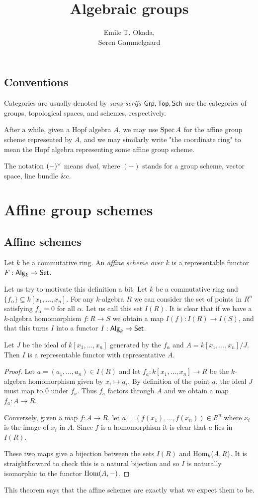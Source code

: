 \documentclass{memoir}
\title{Algebraic groups}
\author{Emile T. Okada,\\ S\o ren Gammelgaard}
\begin{document}
\maketitle
\tableofcontents
\section{Conventions}
Categories are usually denoted by \emph{sans-serifs} \ie $ {\normalfont\mathsf{Grp}}, {\normalfont\mathsf{Top}}, {\normalfont\mathsf{Sch}} $ are the categories of groups, topological spaces, and schemes, respectively. 

After a while, given a Hopf algebra $ A $, we may use $ \operatorname{Spec} A $ for the affine group scheme represented by $ A $, and we may similarly write "the coordinate ring" to mean the Hopf algebra representing some affine group scheme. 

The notation $ (-){}^\vee $ means \emph{dual}, where $ (-) $ stands for a group scheme, vector space, line bundle \&c.
\chapter{Affine group schemes}
\section{Affine schemes}
\begin{definition}
    Let $k$ be a commutative ring. An \textit{affine scheme over $k$} is a representable functor $F:{\normalfont\mathsf{Alg}}_k\to {\normalfont\mathsf{Set}}$.
\end{definition}
Let us try to motivate this definition a bit. 
Let $k$ be a commutative ring and $\{f_\alpha\}\subseteq k[x_1,\dots,x_n]$.
For any $k$-algebra $R$ we can consider the set of points in $R^n$ satisfying $f_\alpha = 0$ for all $\alpha$.
Let us call this set $I(R)$.
It is clear that if we have a $k$-algebra homomorphism $f:R\to S$ we obtain a map $I(f):I(R) \to I(S)$, and that this turns $I$ into a functor $I:{\normalfont\mathsf{Alg}}_k\to {\normalfont\mathsf{Set}}$.
\begin{theorem}
    Let $J$ be the ideal of $k[x_1,\dots,x_n]$ generated by the $f_\alpha$ and $A = k[x_1,\dots,x_n]/J$.
    Then $I$ is a representable functor with representative $A$.
\end{theorem}
\begin{proof}
    Let $a = (a_1,\dots,a_n)\in I(R)$ and let $f_a:k[x_1,\dots,x_n]\to R$ be the $k$-algebra homomorphism given by $x_i\mapsto a_i$.
    By definition of the point $a$, the ideal $J$ must map to 0 under $f_a$.
    Thus $f_a$ factors through $A$ and we obtain a map $\bar f_a: A\to R$.

    Conversely, given a map $f:A\to R$, let $a = (f(\bar x_1),\dots,f(\bar x_n))\in R^n$ where $\bar x_i$ is the image of $x_i$ in $A$.
    Since $f$ is a homomorphism it is clear that $a$ lies in $I(R)$.

    These two maps give a bijection between the sets $I(R)$ and $\operatorname{Hom}_k(A,R)$.
    It is straightforward to check this is a natural bijection and so $I$ is naturally isomorphic to the functor $\operatorname{Hom}(A,-)$.
\end{proof}
This theorem says that the affine schemes are exactly what we expect them to be.
\end{document}
